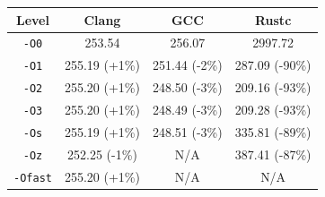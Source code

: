 \begin{tabular*}{\columnwidth}{@{\extracolsep\fill}cccc@{\extracolsep\fill}}
\toprule
\textbf{Level} & \textbf{Clang} & \textbf{GCC} & \textbf{Rustc} \\
\midrule
\texttt{-O0} & 253.54 & 256.07 & 2997.72 \\
\texttt{-O1} & 255.19 (+1\%) & 251.44 (-2\%) & 287.09 (-90\%) \\
\texttt{-O2} & 255.20 (+1\%) & 248.50 (-3\%) & 209.16 (-93\%) \\
\texttt{-O3} & 255.20 (+1\%) & 248.49 (-3\%) & 209.28 (-93\%) \\
\texttt{-Os} & 255.19 (+1\%) & 248.51 (-3\%) & 335.81 (-89\%) \\
\texttt{-Oz} & 252.25 (-1\%) & N/A & 387.41 (-87\%) \\
\texttt{-Ofast} & 255.20 (+1\%) & N/A & N/A \\
\bottomrule
\end{tabular*}
